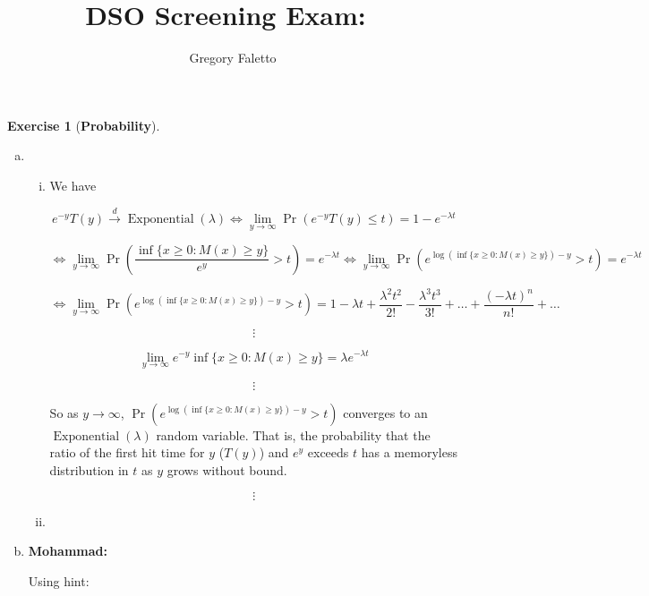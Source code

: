 \documentclass{article}
\title{
    \vspace{2in}
    \textmd{\textbf{DSO Screening Exam:\ \hmwkTitle}}\\
    \vspace{3in}
}
\author{Gregory Faletto}
\date{}
\theoremstyle{definition}
\newtheorem{exercise}{Exercise}
\theoremstyle{definition}
\theoremstyle{definition}
\theoremstyle{definition}
\begin{document}
\maketitle

\pagebreak


\begin{exercise}[\textbf{Probability}]

\begin{enumerate}[(a)]

\item 

\begin{enumerate}[(i)]

\item We have

\[
e^{-y} T(y) \xrightarrow{d} \operatorname{Exponential}(\lambda) \iff \lim_{y \to \infty} \Pr(e^{-y} T(y) \leq t) = 1 - e^{-\lambda t} 
\]

\[
\iff \lim_{y \to \infty} \Pr \left( \frac{  \inf \{x \geq 0: M(x) \geq y\} }{e^y}  > t \right) = e^{-\lambda t} \iff \lim_{y \to \infty} \Pr \left(  e^ { \log \left( \inf \{x \geq 0: M(x) \geq y\} \right)  - y }  > t \right) = e^{-\lambda t}
\]

\[
\iff \lim_{y \to \infty} \Pr \left(  e^ { \log \left( \inf \{x \geq 0: M(x) \geq y\} \right)  - y }  > t \right) = 1 - \lambda t +\frac{\lambda^2t^2}{2!} - \frac{\lambda^3t^3}{3!} + \ldots + \frac{(-\lambda t)^n}{n!} + \ldots 
\]

\[
\vdots
\]

\[
\lim_{y \to \infty} e^{-y}  \inf \{x \geq 0: M(x) \geq y\}  =  \lambda e^{- \lambda t} 
\]

\[
\vdots
\]

So as \(y \to \infty\), \(\Pr \left(  e^ { \log \left( \inf \{x \geq 0: M(x) \geq y\} \right)  - y }  > t \right) \) converges to an \(\operatorname{Exponential}(\lambda)\) random variable. That is, the probability that the ratio of the first hit time for \(y\) (\(T(y)\)) and \(e^y\) exceeds \(t\) has a memoryless distribution in \(t\) as \(y\) grows without bound.

\[
\vdots
\]


\item

\end{enumerate}

\item \textbf{Mohammad:}

Using hint:


\end{enumerate}
\end{exercise}
\end{document}
